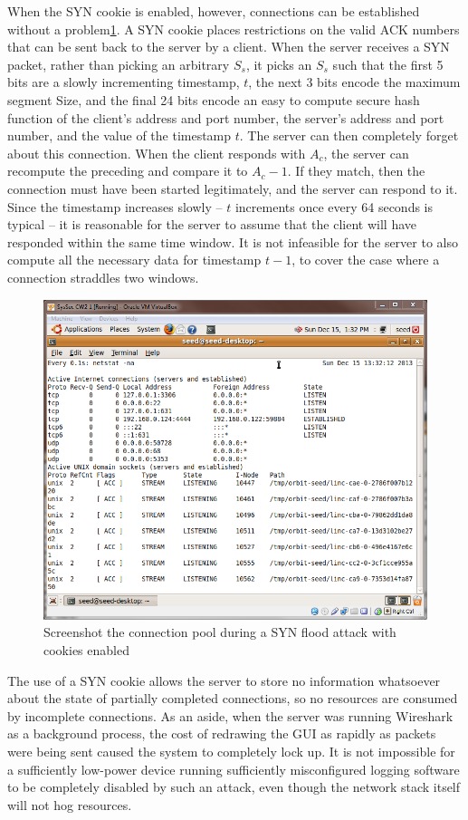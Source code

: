 When the SYN cookie is enabled, however, connections can be established without a problem\ref{fig:flood_with_cookie}.
A SYN cookie places restrictions on the valid ACK numbers that can be sent back to the server by a client. When the
server receives a SYN packet, rather than picking an arbitrary $S_s$, it picks an $S_s$ such that the first 5 bits are a
slowly incrementing timestamp, $t$, the next 3 bits encode the maximum segment Size, and the final 24 bits encode an
easy to compute secure hash function of the client's address and port number, the server's address and port number, and
the value of the timestamp $t$. The server can then completely forget about this connection. When the client responds
with $A_c$, the server can recompute the preceding and compare it to $A_c-1$. If they match, then the connection must
have been started legitimately, and the server can respond to it. Since the timestamp increases slowly -- $t$ increments
once every 64 seconds is typical -- it is reasonable for the server to assume that the client will have responded within
the same time window. It is not infeasible for the server to also compute all the necessary data for timestamp $t-1$, to
cover the case where a connection straddles two windows.

\begin{figure}[h]
    \centering \includegraphics[width=.7\linewidth]{images/syn_flood_cookie.png}
    \caption{Screenshot the connection pool during a SYN flood attack with cookies enabled}
    \label{fig:flood_with_cookie}
\end{figure}

The use of a SYN cookie allows the server to store no information whatsoever about the state of partially completed
connections, so no resources are consumed by incomplete connections. As an aside, when the server was running Wireshark
as a background process, the cost of redrawing the GUI as rapidly as packets were being sent caused the system to
completely lock up. It is not impossible for a sufficiently low-power device running sufficiently misconfigured logging
software to be completely disabled by such an attack, even though the network stack itself will not hog resources.

